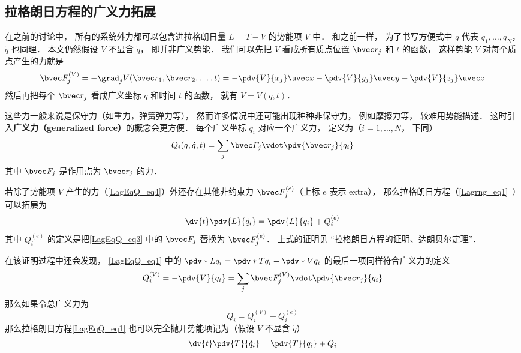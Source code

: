 

\subsection{拉格朗日方程的广义力拓展}
在之前的讨论中， 所有的系统外力都可以包含进拉格朗日量 $L = T-V$ 的势能项 $V$ 中． 和之前一样， 为了书写方便式中 $q$ 代表 $q_1, \dots, q_N$， $\dot q$ 也同理． 本文仍然假设 $V$ 不显含 $\dot q$， 即并非广义势能． 我们可以先把 $V$ 看成所有质点位置 $\bvec r_j$ 和 $t$ 的函数， 这样势能 $V$ 对每个质点产生的力就是
\begin{equation}\label{LagEqQ_eq4}
\bvec F_j^{(V)} = - \grad_j V(\bvec r_1,\bvec r_2,\dots,t) = -\pdv{V}{x_j}\uvec x - \pdv{V}{y_j}\uvec y - \pdv{V}{z_j} \uvec z
\end{equation}
然后再把每个 $\bvec r_j$ 看成广义坐标 $q$ 和时间 $t$ 的函数， 就有 $V = V(q,t)$．

这些力一般来说是保守力（如重力，弹簧弹力等）， 然而许多情况中还可能出现种种非保守力， 例如摩擦力等， 较难用势能描述． 这时引入\textbf{广义力（generalized force）}的概念会更方便． 每个广义坐标 $q_i$ 对应一个广义力， 定义为（$i=1,\dots,N$， 下同）
\begin{equation}\label{LagEqQ_eq3}
Q_i(q, \dot q, t) = \sum_j \bvec F_j \vdot \pdv{\bvec r_j}{q_i}
\end{equation}
其中 $\bvec F_j$ 是作用点为 $\bvec r_j$ 的力．

若除了势能项 $V$ 产生的力（\autoref{LagEqQ_eq4}）外还存在其他非约束力 $\bvec F_j^{(e)}$（上标 $e$ 表示 extra）， 那么拉格朗日方程（\autoref{Lagrng_eq1}~）可以拓展为
\begin{equation}\label{LagEqQ_eq1}
\dv{t} \pdv{L}{\dot q_i} = \pdv{L}{q_i} + Q_i^{(e)}
\end{equation}
其中 $Q_i^{(e)}$ 的定义是把\autoref{LagEqQ_eq3} 中的 $\bvec F_j$ 替换为 $\bvec F_j^{(e)}$． 上式的证明见 “拉格朗日方程的证明、达朗贝尔定理”．

在该证明过程中还会发现， \autoref{LagEqQ_eq1} 中的 $\pdv*{L}{q_i} = \pdv*{T}{q_i} - \pdv*{V}{q_i}$ 的最后一项同样符合广义力的定义
\begin{equation}
Q_i^{(V)} = -\pdv{V}{q_i} = \sum_j \bvec F_j^{(V)} \vdot \pdv{\bvec r_j}{q_i}
\end{equation}
那么如果令总广义力为
\begin{equation}
Q_i = Q_i^{(V)} + Q_i^{(e)}
\end{equation}
那么拉格朗日方程\autoref{LagEqQ_eq1} 也可以完全抛开势能项记为（假设 $V$ 不显含 $\dot q$）
\begin{equation}\label{LagEqQ_eq2}
\dv{t} \pdv{T}{\dot q_i} = \pdv{T}{q_i} + Q_i
\end{equation}

